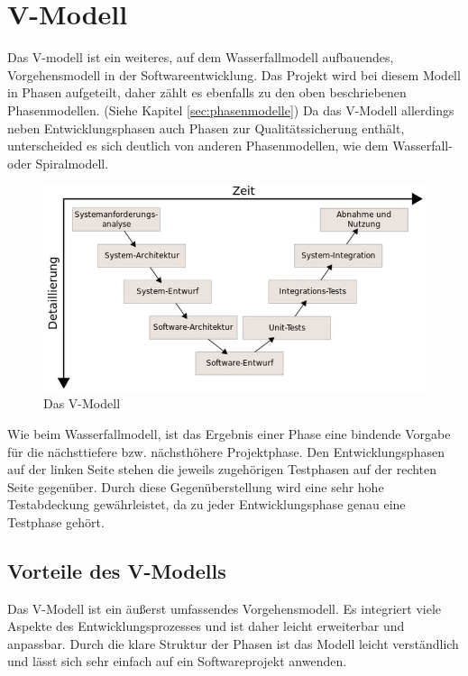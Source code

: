 \documentclass[a4paper, twopage]{scrreprt}
\begin{document}
\chapter{V-Modell}
\label{ch:vmodell}
Das V-modell ist ein weiteres, auf dem Wasserfallmodell aufbauendes, Vorgehensmodell in der Softwareentwicklung. Das Projekt wird bei diesem Modell in Phasen aufgeteilt, daher zählt es ebenfalls zu den oben beschriebenen Phasenmodellen. (Siehe Kapitel \ref{sec:phasenmodelle}) Da das V-Modell allerdings neben Entwicklungsphasen auch Phasen zur Qualitätssicherung enthält, unterscheided es sich deutlich von anderen Phasenmodellen, wie dem Wasserfall- oder Spiralmodell. \par
\begin{figure}[h]
\centering
	\includegraphics[scale=0.6]{Images/vmodell}
	\caption[Das V-Modell]{Das V-Modell\cite{wikipedia:vmodell}}
	\label{fig:vmodell}
\end{figure}
Wie beim Wasserfallmodell, ist das Ergebnis einer Phase eine bindende Vorgabe für die nächsttiefere bzw. nächsthöhere Projektphase. Den Entwicklungsphasen auf der linken Seite stehen die jeweils zugehörigen Testphasen auf der rechten Seite gegenüber. Durch diese Gegenüberstellung wird eine sehr hohe Testabdeckung gewährleistet, da zu jeder Entwicklungsphase genau eine Testphase gehört.
\section{Vorteile des V-Modells}
\label{sec:vmodell_vorteile}
Das V-Modell ist ein äußerst umfassendes Vorgehensmodell. Es integriert viele Aspekte des Entwicklungsprozesses und ist daher leicht erweiterbar und anpassbar. Durch die klare Struktur der Phasen ist das Modell leicht verständlich und lässt sich sehr einfach auf ein Softwareprojekt anwenden.
\end{document}
